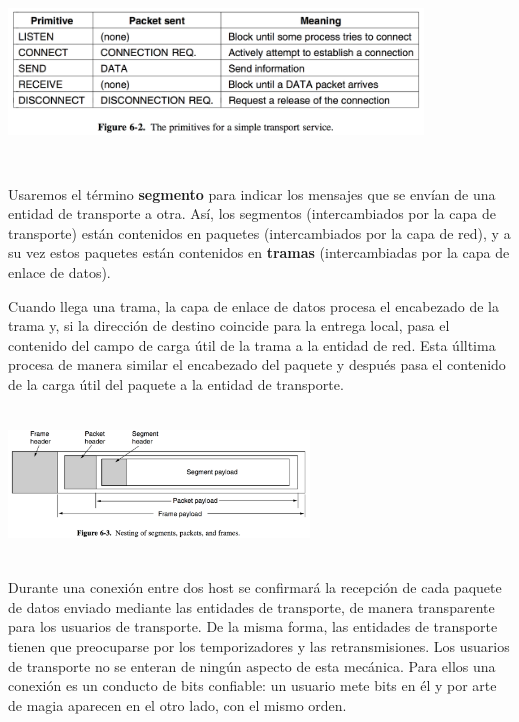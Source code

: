 \documentclass[10pt,a4paper]{report}
\begin{document}
\begin{center}
	\includegraphics[width=11cm, height=5cm]{./imagenes/primitivas.png} 
\end{center}

\par Usaremos el término \textbf{segmento} para indicar los mensajes que se envían 
de una entidad de transporte a otra. Así, los segmentos (intercambiados por la capa 
de transporte) están contenidos en paquetes (intercambiados por la capa de red), y a 
su vez estos paquetes están contenidos en \textbf{tramas} (intercambiadas por la 
capa de enlace de datos).
\par Cuando llega una trama, la capa de enlace de datos procesa el encabezado de la 
trama y, si la dirección de destino coincide para la entrega local, pasa el contenido del 
campo de carga útil de la trama a la entidad de red. Esta úlltima procesa de manera 
similar el encabezado del paquete y después pasa el contenido de la carga útil del 
paquete a la entidad de transporte. 

\begin{center}
	\includegraphics[width=8cm, height=4cm]{./imagenes/segmentos.png} 
\end{center}

\par Durante una conexión entre dos host se confirmará la recepción de cada 
paquete de datos enviado mediante las entidades de transporte, de manera 
transparente para los usuarios de transporte. De la misma forma, las entidades de 
transporte tienen que preocuparse por los temporizadores y las retransmisiones. Los 
usuarios de transporte no se enteran de ningún aspecto de esta mecánica. Para ellos 
una conexión es un conducto de bits confiable: un usuario mete bits en él y por arte 
de magia aparecen en el otro lado, con el mismo orden.
\end{document}
